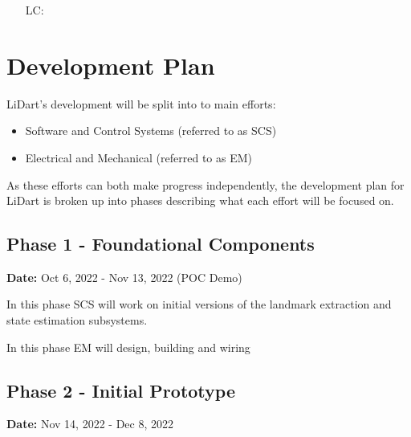 \documentclass[12pt]{article}
\newcounter{lcnum} %
\begin{document}
\noindent \begin{itemize}

\item[LC\refstepcounter{lcnum}\thelcnum\label{LC_meaningfulLabel}:] 

\end{itemize}

\section{Development Plan}
\label{sec_dp}


LiDart's development will be split into to main efforts:
\begin{itemize}
    \item Software and Control Systems (referred to as SCS)
    \item Electrical and Mechanical (referred to as EM)
\end{itemize}

As these efforts can both make progress independently, the development plan for
LiDart is broken up into phases describing what each effort will be focused on.

\subsection{Phase 1 - Foundational Components}
\textbf{Date:} Oct 6, 2022 - Nov 13, 2022 (POC Demo)

In this phase SCS will work on initial versions of the landmark extraction and state estimation subsystems.

In this phase EM will design, building and wiring 

\subsection{Phase 2 - Initial Prototype}
\textbf{Date:} Nov 14, 2022 - Dec 8, 2022
\end{document}
